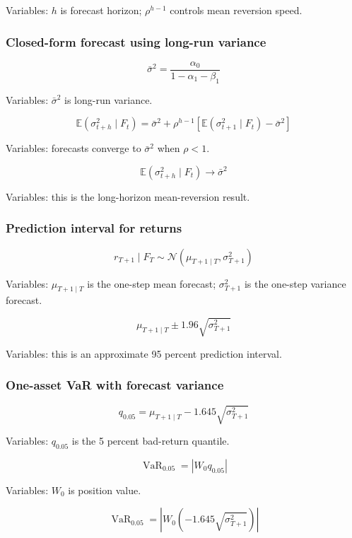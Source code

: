 \documentclass[
  8pt,
  twocolumn]{extarticle}
\begin{document}
Variables: \(h\) is forecast horizon; \(\rho^{h-1}\) controls mean
reversion speed.

\subsubsection{Closed-form forecast using long-run
variance}\label{closed-form-forecast-using-long-run-variance}

\[
\bar\sigma^2=\frac{\alpha_0}{1-\alpha_1-\beta_1}
\]

Variables: \(\bar\sigma^2\) is long-run variance.

\[
\mathbb E(\sigma_{t+h}^2\mid F_t)=\bar\sigma^2+\rho^{h-1}\left[\mathbb E(\sigma_{t+1}^2\mid F_t)-\bar\sigma^2\right]
\]

Variables: forecasts converge to \(\bar\sigma^2\) when \(\rho<1\).

\[
\mathbb E(\sigma_{t+h}^2\mid F_t)\to\bar\sigma^2
\]

Variables: this is the long-horizon mean-reversion result.

\subsubsection{Prediction interval for
returns}\label{prediction-interval-for-returns}

\[
r_{T+1}\mid F_T\sim\mathcal N(\mu_{T+1\mid T},\sigma_{T+1}^2)
\]

Variables: \(\mu_{T+1\mid T}\) is the one-step mean forecast;
\(\sigma_{T+1}^2\) is the one-step variance forecast.

\[
\mu_{T+1\mid T}\pm1.96\sqrt{\sigma_{T+1}^2}
\]

Variables: this is an approximate 95 percent prediction interval.

\subsubsection{One-asset VaR with forecast
variance}\label{one-asset-var-with-forecast-variance}

\[
q_{0.05}=\mu_{T+1\mid T}-1.645\sqrt{\sigma_{T+1}^2}
\]

Variables: \(q_{0.05}\) is the 5 percent bad-return quantile.

\[
\operatorname{VaR}_{0.05}=|W_0q_{0.05}|
\]

Variables: \(W_0\) is position value.

\[
\operatorname{VaR}_{0.05}=|W_0(-1.645\sqrt{\sigma_{T+1}^2})|
\]
\end{document}
